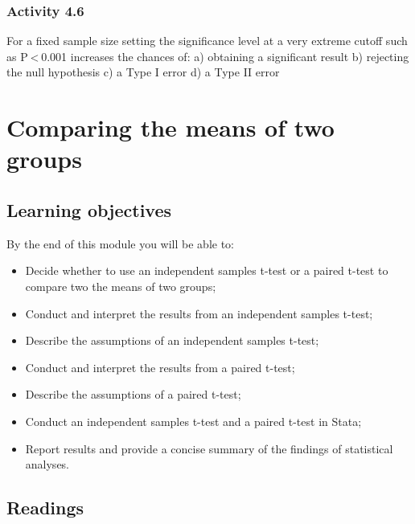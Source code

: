 \documentclass[
]{memoir}
\providecommand{\tightlist}{%
  \setlength{\itemsep}{0pt}\setlength{\parskip}{0pt}}
\begin{document}
\hypertarget{activity-4.6}{%
\subsection{Activity 4.6}\label{activity-4.6}}

For a fixed sample size setting the significance level at a very extreme cutoff such as P \textless{} 0.001 increases the chances of:
a) obtaining a significant result
b) rejecting the null hypothesis
c) a Type I error
d) a Type II error

\hypertarget{comparing-the-means-of-two-groups}{%
\chapter{Comparing the means of two groups}\label{comparing-the-means-of-two-groups}}

\hypertarget{learning-objectives-4}{%
\section*{Learning objectives}\label{learning-objectives-4}}

By the end of this module you will be able to:

\begin{itemize}
\tightlist
\item
  Decide whether to use an independent samples t-test or a paired t-test to compare two the means of two groups;
\item
  Conduct and interpret the results from an independent samples t-test;
\item
  Describe the assumptions of an independent samples t-test;
\item
  Conduct and interpret the results from a paired t-test;
\item
  Describe the assumptions of a paired t-test;
\item
  Conduct an independent samples t-test and a paired t-test in Stata;
\item
  Report results and provide a concise summary of the findings of statistical analyses.
\end{itemize}

\hypertarget{readings-4}{%
\section*{Readings}\label{readings-4}}
\end{document}
